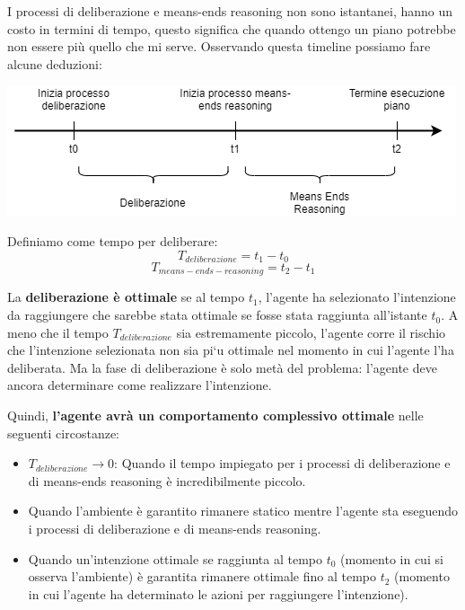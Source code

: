 I processi di deliberazione e means-ends reasoning non sono istantanei, hanno un costo in termini di tempo, questo significa che quando ottengo un piano potrebbe non essere più quello che mi serve. Osservando questa timeline possiamo fare alcune deduzioni:

\begin{center}
    \includegraphics[scale=0.6]{images/deliberazion_meansend_timechart.png}
\end{center}

Definiamo come tempo per deliberare:
\begin{displaymath}
    T_{deliberazione} = t_1 - t_0
\end{displaymath}
\begin{displaymath}
    T_{means-ends-reasoning} = t_2 - t_1
\end{displaymath}

La \textbf{deliberazione è ottimale} se al tempo $t_1$, l’agente ha selezionato l’intenzione da raggiungere che sarebbe stata ottimale se fosse stata raggiunta all’istante $t_0$. A meno che il tempo $T_{deliberazione}$ sia estremamente piccolo, l’agente corre il rischio che l’intenzione selezionata non sia pi`u ottimale nel momento in cui l’agente l’ha deliberata. Ma la fase di deliberazione è solo metà del problema: l’agente deve ancora determinare come realizzare l’intenzione. 

Quindi, \textbf{l’agente avrà un comportamento complessivo ottimale} nelle seguenti circostanze:
\begin{itemize}
    \item $T_{deliberazione} \rightarrow 0$: Quando il tempo impiegato per i processi di deliberazione e di means-ends reasoning è incredibilmente piccolo.
    \item Quando l'ambiente è garantito rimanere statico mentre l’agente sta eseguendo i processi di deliberazione e di means-ends reasoning.
    \item Quando un’intenzione ottimale se raggiunta al tempo $t_0$ (momento in cui si osserva l'ambiente) è garantita rimanere ottimale fino al tempo $t_2$ (momento in cui l’agente ha determinato le azioni per raggiungere l’intenzione).
\end{itemize}

